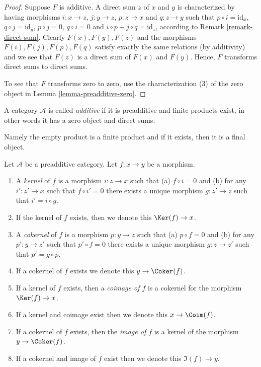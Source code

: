 \begin{proof}
Suppose $F$ is additive. A direct sum $z$
of $x$ and $y$ is characterized by having morphisms
$i : x \to z$, $j : y \to z$, $p : z \to x$ and
$q : z \to y$ such that $p \circ i = \text{id}_x$,
$q \circ j = \text{id}_y$, $p \circ j = 0$, $q \circ i = 0$
and $i \circ p + j \circ q = \text{id}_z$, according
to Remark \ref{remark-direct-sum}. Clearly $F(x), F(y), F(z)$
and the morphisms $F(i), F(j), F(p), F(q)$ satisfy exactly the
same relations (by additivity) and we see that $F(z)$ is
a direct sum of $F(x)$ and $F(y)$.
Hence, $F$ transforms direct sums to direct sums.

\medskip\noindent
To see that $F$ transforms zero to zero, use the
characterization (3) of the zero object in
Lemma \ref{lemma-preadditive-zero}.
\end{proof}

\begin{definition}
\label{definition-additive-category}
A category $\mathcal{A}$ is called {\it additive}
if it is preadditive and finite products exist, in other
words it has a zero object and direct sums.
\end{definition}

\noindent
Namely the empty product is a finite product and
if it exists, then it is a final object.

\begin{definition}
\label{definition-kernel}
Let $\mathcal{A}$ be a preadditive category.
Let $f : x \to y$ be a morphism.
\begin{enumerate}
\item A {\it kernel} of $f$ is a morphism
$i : z \to x$ such that (a) $f \circ i = 0$ and (b)
for any $i' : z' \to x$ such that $f \circ i' = 0$ there
exists a unique morphism $g : z' \to z$ such that
$i' = i \circ g$.
\item If the kernel of $f$ exists, then we denote
this $\Ker(f) \to x$.
\item A {\it cokernel} of $f$ is a morphism
$p : y \to z$ such that (a) $p \circ f = 0$ and (b)
for any $p' : y \to z'$ such that $p' \circ f = 0$ there
exists a unique morphism $g : z \to z'$ such that
$p' = g \circ p$.
\item If a cokernel of $f$ exists we denote this
$y \to \Coker(f)$.
\item If a kernel of $f$ exists, then a {\it coimage
of $f$} is a cokernel for the morphism $\Ker(f) \to x$.
\item If a kernel and coimage exist then we denote this
$x \to \Coim(f)$.
\item If a cokernel of $f$ exists, then the {\it image of
$f$} is a kernel of the morphism $y \to \Coker(f)$.
\item If a cokernel and image of $f$ exist then we denote
this $\Im(f) \to y$.
\end{enumerate}
\end{definition}

